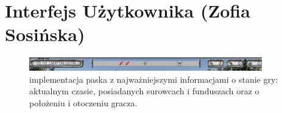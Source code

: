 \section{Interfejs Użytkownika (Zofia Sosińska)}\label{chap:ui}

\begin{figure}[htbp]
    \centering
    \includegraphics[width=0.9\textwidth]{images/ui/naszpasek.png}
    \caption{implementacja paska z najważniejszymi informacjami o stanie gry: aktualnym czasie, posiadanych surowcach i funduszach oraz o położeniu i otoczeniu gracza.
    }\label{fig:compass}
\end{figure}
 
